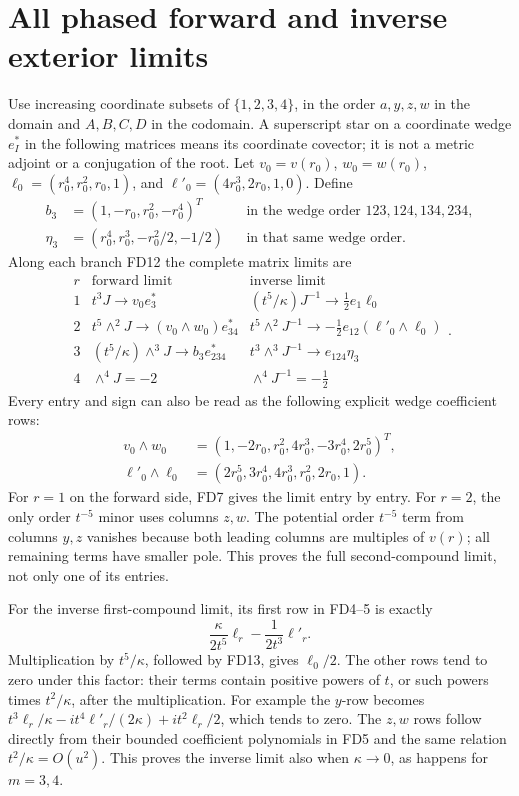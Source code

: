 \section{All phased forward and inverse exterior limits}
Use increasing coordinate subsets of \(\{1,2,3,4\}\), in
the order \(a,y,z,w\) in the domain and \(A,B,C,D\) in the
codomain. A superscript star on a coordinate wedge \(e_I^*\)
in the following matrices means its coordinate covector;
it is not a metric adjoint or a conjugation of the root.
Let \(v_0=v(r_0)\), \(w_0=w(r_0)\),
\(\ell_0=(r_0^4,r_0^2,r_0,1)\), and
\(\ell'_0=(4r_0^3,2r_0,1,0)\). Define
\[
\begin{aligned}
 b_3&=(1,-r_0,r_0^2,-r_0^4)^T
       &&\text{in the wedge order }123,124,134,234,\\
 \eta_3&=(r_0^4,r_0^3,-r_0^2/2,-1/2)
       &&\text{in that same wedge order}.
\end{aligned}
\]
Along each branch FD12 the complete matrix limits are
\[
\boxed{\begin{array}{c|c|c}
 r&\text{forward limit}&\text{inverse limit}\\\hline
 1&t^3J\longrightarrow v_0e_3^*
       &(t^5/\kappa)J^{-1}\longrightarrow\tfrac12e_1\ell_0\\
 2&t^5\wedge^2J\longrightarrow(v_0\wedge w_0)e_{34}^*
       &t^5\wedge^2J^{-1}\longrightarrow
                    -\tfrac12e_{12}(\ell'_0\wedge\ell_0)\\
 3&(t^5/\kappa)\wedge^3J\longrightarrow b_3e_{234}^*
       &t^3\wedge^3J^{-1}\longrightarrow e_{124}\eta_3\\
 4&\wedge^4J=-2&\wedge^4J^{-1}=-\tfrac12
\end{array}.}\tag{FD14}
\]
Every entry and sign can also be read as the following
explicit wedge coefficient rows:
\[
\begin{aligned}
 v_0\wedge w_0&=(1,-2r_0,r_0^2,4r_0^3,-3r_0^4,2r_0^5)^T,\\
 \ell'_0\wedge\ell_0&=(2r_0^5,3r_0^4,4r_0^3,r_0^2,2r_0,1).
\end{aligned}\tag{FD15}
\]
For \(r=1\) on the forward side, FD7 gives the limit
entry by entry. For \(r=2\), the only order \(t^{-5}\)
minor uses columns \(z,w\). The potential order \(t^{-5}\)
term from columns \(y,z\) vanishes because both leading
columns are multiples of \(v(r)\); all remaining terms
have smaller pole. This proves the full second-compound
limit, not only one of its entries.

For the inverse first-compound limit, its first row in
FD4--5 is exactly
\[
 \frac{\kappa}{2t^5}\ell_r-\frac1{2t^3}\ell'_r.
 \tag{FD16}
\]
Multiplication by \(t^5/\kappa\), followed by FD13,
gives \(\ell_0/2\). The other rows tend to zero under
this factor: their terms contain positive powers of \(t\),
or such powers times \(t^2/\kappa\), after the multiplication.
For example the \(y\)-row becomes
\(t^3\ell_r/\kappa-it^4\ell'_r/(2\kappa)
+i t^2\ell_r/2\), which tends to zero. The \(z,w\)
rows follow directly from their bounded coefficient
polynomials in FD5 and the same relation
\(t^2/\kappa=O(u^2)\). This proves the inverse limit
also when \(\kappa\to0\), as happens for \(m=3,4\).

